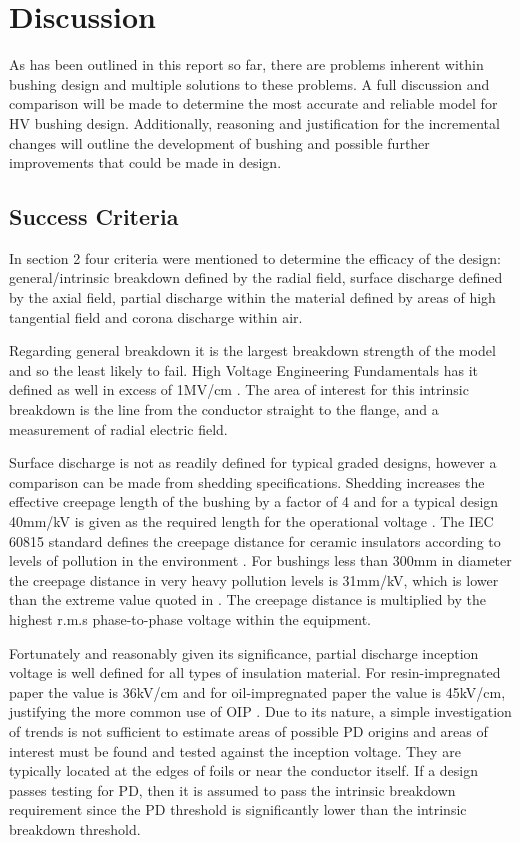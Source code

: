 
\section{Discussion} \label{s:Discussion}
As has been outlined in this report so far, there are problems inherent within bushing design and multiple solutions to these problems. A full discussion and comparison will be made to determine the most accurate and reliable model for HV bushing design. Additionally, reasoning and justification for the incremental changes will outline the development of bushing and possible further improvements that could be made in design.
\subsection{Success Criteria}
In section 2 four criteria were mentioned to determine the efficacy of the design: general/intrinsic breakdown defined by the radial field, surface discharge defined by the axial field, partial discharge within the material defined by areas of high tangential field and corona discharge within air. 

Regarding general breakdown it is the largest breakdown strength of the model and so the least likely to fail. High Voltage Engineering Fundamentals has it defined as well in excess of  1MV/cm \cite{kuffel2000high}. The area of interest for this intrinsic breakdown is the line from the conductor straight to the flange, and a measurement of radial electric field.

Surface discharge is not as readily defined for typical graded designs, however a comparison can be made from shedding specifications. Shedding increases the effective creepage length of the bushing by a factor of 4 and for a typical design 40mm/kV is given as the required length for the operational voltage \cite{HVEngandTesting}. 
The IEC 60815 standard defines the creepage distance for ceramic insulators according to levels of pollution in the environment \cite{IEC60137}.
For bushings less than 300mm in diameter the creepage distance in very heavy pollution levels is 31mm/kV, which is lower than the extreme value quoted in \cite{HVEngandTesting}. 
The creepage distance is multiplied by the highest r.m.s phase-to-phase voltage within the equipment.


Fortunately and reasonably given its significance, partial discharge inception voltage is well defined for all types of insulation material. For resin-impregnated paper the value is 36kV/cm and for oil-impregnated paper the value is 45kV/cm, justifying the more common use of OIP \cite{HVEngandTesting}. Due to its nature, a simple investigation of trends is not sufficient to estimate areas of possible PD origins and areas of interest must be found and tested against the inception voltage. They are typically located at the edges of foils or near the conductor itself. 
If a design passes testing for PD, then it is assumed to pass the intrinsic breakdown requirement since the PD threshold is significantly lower than the intrinsic breakdown threshold.


